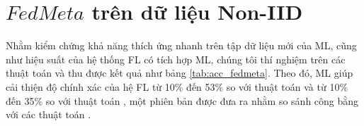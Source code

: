 \begin{table}[H]
    \centering
    \caption{Bảng độ chính xác (\%) của thuật toán FedAvg, FedAvgMeta, FedPerMeta tính trên điểm dữ liệu (dữ liệu IID và Non-IID)}
    \label{tab:fedavg_acc}
\end{table}

\section{$FedMeta$ trên dữ liệu Non-IID}


Nhằm kiểm chứng khả năng thích ứng nhanh trên tập dữ liệu mới của ML, cũng như hiệu suất của hệ thống FL có tích hợp ML, chúng tôi thí nghiệm trên các thuật toán  và thu được kết quả như bảng \ref{tab:acc_fedmeta}. Theo đó, ML giúp cải thiện độ chính xác của hệ FL từ 10\% đến 53\% so với thuật toán  và từ 10\% đến 35\% so với thuật toán , một phiên bản được đưa ra nhằm so sánh công bằng với các thuật toán .

